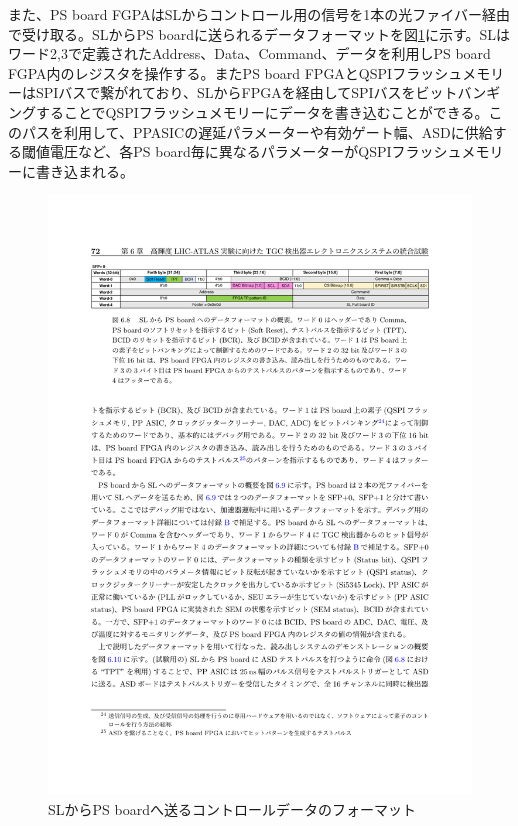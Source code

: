 また、PS board FGPAはSLからコントロール用の信号を1本の光ファイバー経由で受け取る。SLからPS boardに送られるデータフォーマットを図\ref{TGC_PSBdownlink}に示す。SLはワード2,3で定義されたAddress、Data、Command、データを利用しPS board FGPA内のレジスタを操作する。またPS board FPGAとQSPIフラッシュメモリーはSPIバスで繋がれており、SLからFPGAを経由してSPIバスをビットバンギングすることでQSPIフラッシュメモリーにデータを書き込むことができる。このパスを利用して、PPASICの遅延パラメーターや有効ゲート幅、ASDに供給する閾値電圧など、各PS board毎に異なるパラメーターがQSPIフラッシュメモリーに書き込まれる。

\begin{figure} 
\centering
\includegraphics[width=16cm]{fig/Intro/TGC_PSBdownlink.pdf}
\caption[SLからPS boardへ送るコントロールデータのフォーマット]{SLからPS boardへ送るコントロールデータのフォーマット\cite{mt_aoki}}
\label{TGC_PSBdownlink}
\end{figure}

